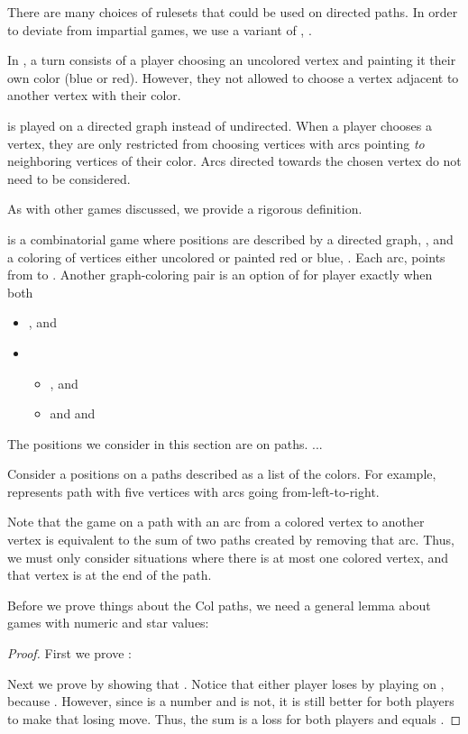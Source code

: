 \documentclass[letter,10pt]{article}
\begin{document}
There are many choices of rulesets that could be used on directed paths.  In order to deviate from impartial games, we use a variant of , .  

In , a turn consists of a player choosing an uncolored vertex and painting it their own color (blue or red).  However, they not allowed to choose a vertex adjacent to another vertex with their color.

 is played on a directed graph instead of undirected.  When a player chooses a vertex, they are only restricted from choosing vertices with arcs pointing \emph{to} neighboring vertices of their color.  Arcs directed towards the chosen vertex do not need to be considered.

As with other games discussed, we provide a rigorous definition.

\begin{definition}
	\label{def:myopicCol}
	 is a combinatorial game where positions are described by a directed graph, , and a coloring of vertices either uncolored or painted red or blue, .  Each arc,  points from  to .  Another graph-coloring pair  is an option of  for player  exactly when both
	\begin{itemize}
	  \item , and
	  \item  
	  \begin{itemize}
	    \item , and
	    \item  and  and 
	   \end{itemize}
	\end{itemize}
\end{definition}

The positions we consider in this section are on paths. ...

Consider a positions on a paths described as a list of the colors.  For example,  represents path with five vertices with arcs going from-left-to-right.

Note that the game on a path with an arc from a colored vertex to another vertex is equivalent to the sum of two paths created by removing that arc.  Thus, we must only consider situations where there is at most one colored vertex, and that vertex is at the end of the path.

Before we prove things about the Col paths, we need a general lemma about games with numeric and star values:

\begin{lemma}
\label{lem:numbersPlusStar}
  
  
\end{lemma}
\begin{proof}
  First we prove : 
  
  
  Next we prove  by showing that . Notice that either player loses by playing on , because .  However, since  is a number and  is not, it is still better for both players to make that losing move.  Thus, the sum is a loss for both players and equals .
\end{proof}
\end{document}
